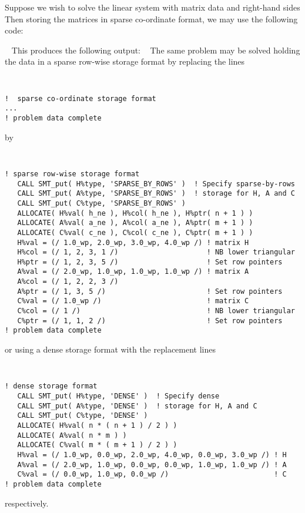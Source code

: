 \documentclass{galahad}
\begin{document}

\galexample
Suppose we wish to solve the linear system  with matrix data
and right-hand sides
Then storing the matrices in sparse co-ordinate format,
we may use the following code:

{\tt \small
\VerbatimInput{\packageexample}
}
\noindent
This produces the following output:
{\tt \small
\VerbatimInput{\packageresults}
}
\noindent
The same problem may be solved holding the data in 
a sparse row-wise storage format by replacing the lines
{\tt \small
\begin{verbatim}
!  sparse co-ordinate storage format
...
! problem data complete   
\end{verbatim}
}
\noindent
by
{\tt \small
\begin{verbatim}
! sparse row-wise storage format
   CALL SMT_put( H%type, 'SPARSE_BY_ROWS' )  ! Specify sparse-by-rows
   CALL SMT_put( A%type, 'SPARSE_BY_ROWS' )  ! storage for H, A and C
   CALL SMT_put( C%type, 'SPARSE_BY_ROWS' )
   ALLOCATE( H%val( h_ne ), H%col( h_ne ), H%ptr( n + 1 ) )
   ALLOCATE( A%val( a_ne ), A%col( a_ne ), A%ptr( m + 1 ) )
   ALLOCATE( C%val( c_ne ), C%col( c_ne ), C%ptr( m + 1 ) )
   H%val = (/ 1.0_wp, 2.0_wp, 3.0_wp, 4.0_wp /) ! matrix H
   H%col = (/ 1, 2, 3, 1 /)                     ! NB lower triangular
   H%ptr = (/ 1, 2, 3, 5 /)                     ! Set row pointers
   A%val = (/ 2.0_wp, 1.0_wp, 1.0_wp, 1.0_wp /) ! matrix A
   A%col = (/ 1, 2, 2, 3 /)
   A%ptr = (/ 1, 3, 5 /)                        ! Set row pointers  
   C%val = (/ 1.0_wp /)                         ! matrix C
   C%col = (/ 1 /)                              ! NB lower triangular
   C%ptr = (/ 1, 1, 2 /)                        ! Set row pointers
! problem data complete   
\end{verbatim}
}
\noindent
or using a dense storage format with the replacement lines
{\tt \small
\begin{verbatim}
! dense storage format
   CALL SMT_put( H%type, 'DENSE' )  ! Specify dense
   CALL SMT_put( A%type, 'DENSE' )  ! storage for H, A and C
   CALL SMT_put( C%type, 'DENSE' )
   ALLOCATE( H%val( n * ( n + 1 ) / 2 ) )
   ALLOCATE( A%val( n * m ) )
   ALLOCATE( C%val( m * ( m + 1 ) / 2 ) )
   H%val = (/ 1.0_wp, 0.0_wp, 2.0_wp, 4.0_wp, 0.0_wp, 3.0_wp /) ! H
   A%val = (/ 2.0_wp, 1.0_wp, 0.0_wp, 0.0_wp, 1.0_wp, 1.0_wp /) ! A
   C%val = (/ 0.0_wp, 1.0_wp, 0.0_wp /)                         ! C
! problem data complete   
\end{verbatim}
}
\noindent
respectively.
\end{document}
